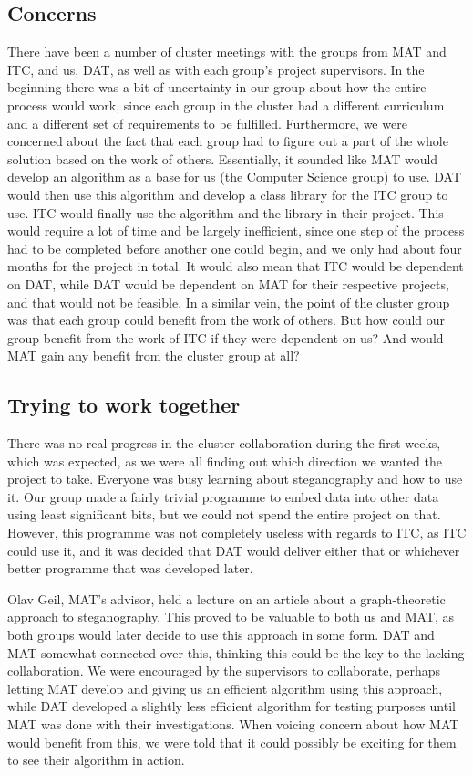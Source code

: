 \subsection*{Concerns}
There have been a number of cluster meetings with the groups from MAT and ITC, and us, DAT, as well as with each group's project supervisors.
In the beginning there was a bit of uncertainty in our group about how the entire process would work, since each group in the cluster had a different curriculum and a different set of requirements to be fulfilled.
Furthermore, we were concerned about the fact that each group had to figure out a part of the whole solution based on the work of others.
Essentially, it sounded like MAT would develop an algorithm as a base for us (the Computer Science group) to use.
DAT would then use this algorithm and develop a class library for the ITC group to use.
ITC would finally use the algorithm and the library in their project.
This would require a lot of time and be largely inefficient, since one step of the process had to be completed before another one could begin, and we only had about four months for the project in total.
It would also mean that ITC would be dependent on DAT, while DAT would be dependent on MAT for their respective projects, and that would not be feasible.
In a similar vein, the point of the cluster group was that each group could benefit from the work of others.
But how could our group benefit from the work of ITC if they were dependent on us? And would MAT gain any benefit from the cluster group at all?

\subsection*{Trying to work together}
There was no real progress in the cluster collaboration during the first weeks, which was expected, as we were all finding out which direction we wanted the project to take.
Everyone was busy learning about steganography and how to use it.
Our group made a fairly trivial programme to embed data into other data using least significant bits, but we could not spend the entire project on that.
However, this programme was not completely useless with regards to ITC, as ITC could use it, and it was decided that DAT would deliver either that or whichever better programme that was developed later.

Olav Geil, MAT's advisor, held a lecture on an article about a graph-theoretic approach to steganography.
This proved to be valuable to both us and MAT, as both groups would later decide to use this approach in some form.
DAT and MAT somewhat connected over this, thinking this could be the key to the lacking collaboration.
We were encouraged by the supervisors to collaborate, perhaps letting MAT develop and giving us an efficient algorithm using this approach, while DAT developed a slightly less efficient algorithm for testing purposes until MAT was done with their investigations.
When voicing concern about how MAT would benefit from this, we were told that it could possibly be exciting for them to see their algorithm in action.

